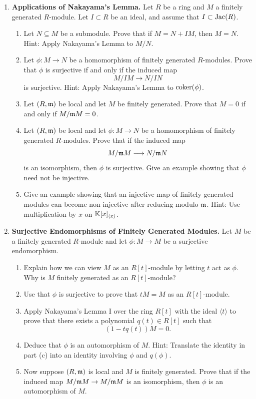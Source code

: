 \documentclass[12pt,reqno]{amsart}
\begin{document}
\begin{enumerate}[leftmargin=*, resume=problems]
\item \textbf{Applications of Nakayama's Lemma.} Let $R$ be a ring and $M$ a finitely generated $R$-module. Let $I \subset R$ be an ideal, and assume that $I \subset \operatorname{Jac}(R)$. 
\begin{enumerate}
    \item Let $N\subseteq M$ be a submodule. Prove that if $M=N+IM$, then $M=N$. Hint: Apply Nakayama's Lemma to $M/N$.
    \item Let $\phi:M\to N$ be a homomorphism of finitely generated $R$-modules. Prove that $\phi$ is surjective if and only if the induced map
    \[
    M/IM\longrightarrow N/IN
    \]
    is surjective. Hint: Apply Nakayama's Lemma to $\operatorname{coker}(\phi)$.
     \item Let $(R,\mathfrak{m})$ be local and let $M$ be finitely generated. Prove that $M=0$ if and only if $M/\mathfrak{m} M=0$.
    \item Let $(R,\mathfrak{m})$ be local and let $\phi:M\to N$ be a homomorphism of finitely generated $R$-modules. Prove that if the induced map
    \[
    M/\mathfrak{m} M\longrightarrow N/\mathfrak{m} N
    \]
    is an isomorphism, then $\phi$ is surjective. Give an example showing that $\phi$ need not be injective.
        \item Give an example showing that an injective map of finitely generated modules can become non-injective after reducing modulo $\mathfrak{m}$. Hint: Use multiplication by $x$ on $\mathbb{K}[x]_{\langle x\rangle}$.
\end{enumerate}


\item \textbf{Surjective Endomorphisms of Finitely Generated Modules.} Let $M$ be a finitely generated $R$-module and let $\phi:M\to M$ be a surjective endomorphism.
\begin{enumerate}
    \item Explain how we can view $M$ as an $R[t]$-module by letting $t$ act as $\phi$. Why is $M$ finitely generated as an $R[t]$-module?
    \item Use that $\phi$ is surjective to prove that $tM=M$ as an $R[t]$-module.
    \item Apply Nakayama's Lemma I over the ring $R[t]$ with the ideal $\langle t\rangle$ to prove that there exists a polynomial $q(t)\in R[t]$ such that
    \[
    (1-tq(t))M=0.
    \]
    \item Deduce that $\phi$ is an automorphism of $M$. Hint: Translate the identity in part (c) into an identity involving $\phi$ and $q(\phi)$.
    \item Now suppose $(R,\mathfrak{m})$ is local and $M$ is finitely generated. Prove that if the induced map $M/\mathfrak{m} M\to M/\mathfrak{m} M$ is an isomorphism, then $\phi$ is an automorphism of $M$.
\end{enumerate}


\end{enumerate}
\end{document}
